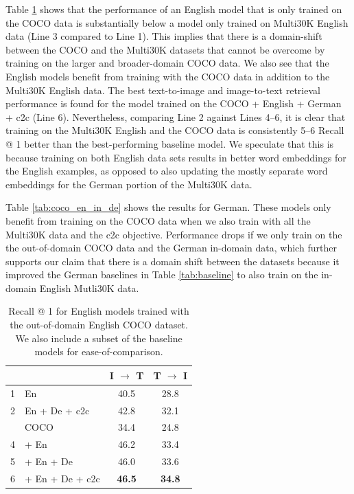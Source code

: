 Table \ref{tab:coco_en} shows that the performance of an English model that is only trained on the COCO data is substantially below a model only trained on Multi30K English data (Line 3 compared to Line 1). This implies that there is a domain-shift between the COCO and the Multi30K datasets that cannot be overcome by training on the larger and broader-domain COCO data. We also see that the English models benefit from training with the COCO data in addition to the Multi30K English data. The best text-to-image and image-to-text retrieval performance is found for the model trained on the COCO + English + German + c2c (Line 6). Nevertheless, comparing Line 2 against Lines 4--6, it is clear that training on the Multi30K English and the COCO data is consistently 5--6 Recall @ 1 better than the best-performing baseline model. We speculate that this is because training on both English data sets results in better word embeddings for the English examples, as opposed to also updating the mostly separate word embeddings for the German portion of the Multi30K data.

Table \ref{tab:coco_en_in_de} shows the results for German. These models only benefit from training on the COCO data when we also train with all the Multi30K data and the c2c objective. Performance drops if we only train on the the out-of-domain COCO data and the German in-domain data, which further supports our claim that there is a domain shift between the datasets because it improved the German baselines in Table \ref{tab:baseline} to also train on the in-domain English Mutli30K data.

\begin{table}[]
    \centering
    \renewcommand{\arraystretch}{1.0}
    \begin{tabular}{rlcc}
        \toprule
         & & I $\rightarrow$ T & T $\rightarrow$ I \\
         \midrule
         1 & En & 40.5 & 28.8 \\
         2 & En + De + c2c & 42.8 & 32.1 \\
         \hdashline         
         3 & COCO & 34.4  & 24.8 \\
         4 & \; + En & 46.2 & 33.4   \\
         5 & \; + En + De & 46.0  & 33.6  \\
         6 & \; + En + De + c2c & \textbf{46.5} & \textbf{34.8} \\         
         \bottomrule
    \end{tabular}
    \caption{Recall @ 1 for English models trained with the out-of-domain English COCO dataset. We also include a subset of the baseline models for ease-of-comparison.}\label{tab:coco_en}
\end{table}

